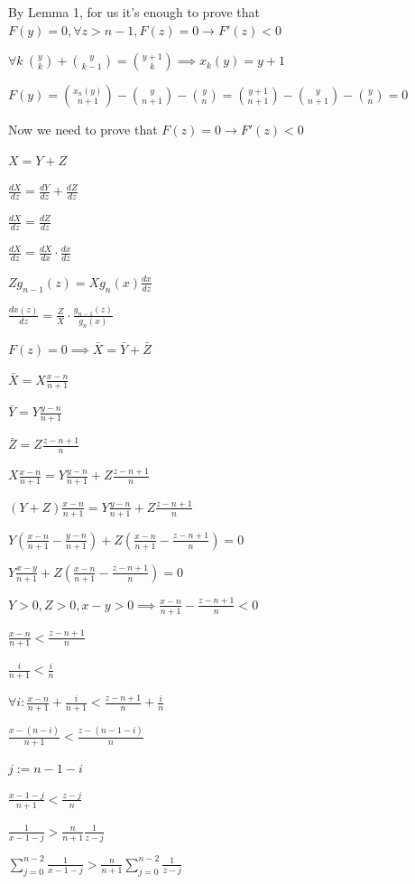 \documentclass{article}
\begin{document}
By Lemma 1, for us it's enough to prove that \( F(y) = 0, \forall z > n - 1, F(z) = 0 \rightarrow F'(z) < 0 \)

\( \forall k\ \binom{y}{k} + \binom{y}{k-1} = \binom{y+1}{k} \implies x_k(y) = y + 1 \)

\( F(y) = \binom{x_n(y)}{n + 1} - \binom{y}{n + 1} - \binom{y}{n} = \binom{y+1}{n + 1} - \binom{y}{n + 1} - \binom{y}{n} = 0 \)

Now we need to prove that \( F(z) = 0 \to F'(z) < 0 \)

\( X = Y + Z \)

\( \frac{dX}{dz} = \frac{dY}{dz} + \frac{dZ}{dz} \)

\( \frac{dX}{dz} = \frac{dZ}{dz} \)

\( \frac{dX}{dz} = \frac{dX}{dx} \cdot \frac{dx}{dz} \)

\( Z g_{n-1}(z) = X g_n(x) \frac{dx}{dz} \)

\( \frac{dx(z)}{dz} = \frac{Z}{X} \cdot \frac{g_{n-1}(z)}{g_n(x)} \)

\( F(z) = 0 \implies \bar{X} = \bar{Y} + \bar{Z} \)

\( \bar{X} = X \frac{x-n}{n+1} \)

\( \bar{Y} = Y \frac{y-n}{n+1} \)

\( \bar{Z} = Z \frac{z-n+1}{n} \)

\( X \frac{x-n}{n+1} = Y \frac{y-n}{n+1} + Z \frac{z-n+1}{n} \)

\( (Y + Z) \frac{x-n}{n+1} = Y \frac{y-n}{n+1} + Z \frac{z-n+1}{n} \)

\( Y(\frac{x-n}{n+1} - \frac{y-n}{n+1}) + Z(\frac{x-n}{n+1} - \frac{z-n+1}{n}) = 0 \)

\( Y \frac{x-y}{n+1} + Z(\frac{x-n}{n+1} - \frac{z-n+1}{n}) = 0 \)

\( Y > 0, Z > 0, x - y > 0 \implies \frac{x-n}{n+1} - \frac{z-n+1}{n} < 0 \)

\( \frac{x-n}{n+1} < \frac{z-n+1}{n} \)

\( \frac{i}{n+1} < \frac{i}{n} \)

\( \forall i: \frac{x-n}{n+1} + \frac{i}{n+1} < \frac{z-n+1}{n} + \frac{i}{n} \)

\( \frac{x-(n-i)}{n+1} < \frac{z-(n-1-i)}{n} \)

\( j := n - 1 - i \)

\( \frac{x-1-j}{n+1} < \frac{z-j}{n} \)

\( \frac{1}{x-1-j} > \frac{n}{n+1}\frac{1}{z-j} \)

\( \sum_{j=0}^{n-2}\frac{1}{x-1-j} > \frac{n}{n+1}\sum_{j=0}^{n-2}\frac{1}{z-j} \)
\end{document}
